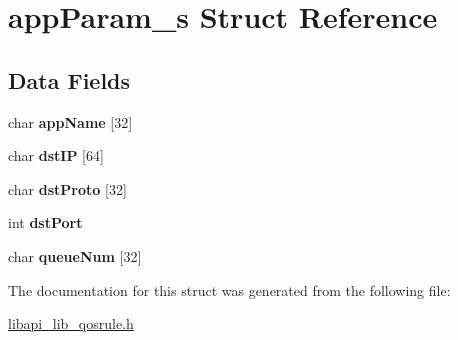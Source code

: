 \hypertarget{structappParam__s}{}\section{app\+Param\+\_\+s Struct Reference}
\label{structappParam__s}
\subsection*{Data Fields}
\begin{DoxyCompactItemize}
\item 
\mbox{\label{structappParam__s_a25f620876da28c8814e32bbf2d2526b9}} 
char {\bfseries app\+Name} \mbox{[}32\mbox{]}
\item 
\mbox{\label{structappParam__s_a95b46668873c5c2d9fbae8c9668bccf1}} 
char {\bfseries dst\+IP} \mbox{[}64\mbox{]}
\item 
\mbox{\label{structappParam__s_a3a8fdefeb53cb9d7d2f87429bb027f12}} 
char {\bfseries dst\+Proto} \mbox{[}32\mbox{]}
\item 
\mbox{\label{structappParam__s_a85b1ddc34debcce6c79db7902b008131}} 
int {\bfseries dst\+Port}
\item 
\mbox{\label{structappParam__s_a81eb1d5c2f5be70f2511e29de4be75d2}} 
char {\bfseries queue\+Num} \mbox{[}32\mbox{]}
\end{DoxyCompactItemize}


The documentation for this struct was generated from the following file\+:\begin{DoxyCompactItemize}
\item 
\hyperlink{libapi__lib__qosrule_8h}{libapi\+\_\+lib\+\_\+qosrule.\+h}\end{DoxyCompactItemize}
